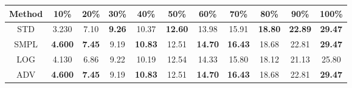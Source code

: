\documentclass{standalone}
\begin{document}
\begin{tabular}{c|cccccccccc}
      \toprule
      Method & 10\% & 20\% & 30\% & 40\% & 50\% & 60\% & 70\% & 80\% & 90\% & 100\% \\
      \midrule
STD & 3.230 & 7.10 & \textbf{9.26} & 10.37 & \textbf{12.60} & 13.98 & 15.91 & \textbf{18.80} & \textbf{22.89} & \textbf{29.47}\\
SMPL & \textbf{4.600} & \textbf{7.45} & 9.19 & \textbf{10.83} & 12.51 & \textbf{14.70} & \textbf{16.43} & 18.68 & 22.81 & \textbf{29.47}\\
LOG & 4.130 & 6.86 & 9.22 & 10.19 & 12.54 & 14.33 & 15.80 & 18.12 & 21.13 & 25.80\\
ADV & \textbf{4.600} & \textbf{7.45} & 9.19 & \textbf{10.83} & 12.51 & \textbf{14.70} & \textbf{16.43} & 18.68 & 22.81 & \textbf{29.47}\\
  \bottomrule
\end{tabular}
\end{document}
